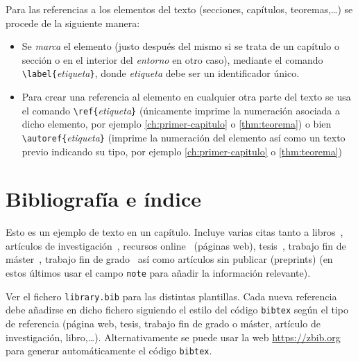 Para las referencias a los elementos del texto (secciones, capítulos, teoremas,\ldots) se procede de la siguiente manera:
\begin{itemize}
  \item Se \emph{marca} el elemento (justo después del mismo si se trata de un capítulo o sección o en el interior del \emph{entorno} en otro caso), mediante el comando \verb+\label{+\emph{etiqueta}\verb+}+, donde \emph{etiqueta} debe ser un identificador único.
  \item Para crear una referencia al elemento en cualquier otra parte del texto se usa el comando \verb+\ref{+\emph{etiqueta}\verb+}+ (únicamente imprime la numeración asociada a dicho elemento, por ejemplo \ref{ch:primer-capitulo} o \ref{thm:teorema}) o bien \verb+\autoref{+\emph{etiqueta}\verb+}+ (imprime la numeración del elemento así como un texto previo indicando su tipo, por ejemplo \autoref{ch:primer-capitulo} o \autoref{thm:teorema})
\end{itemize}




\section{Bibliografía e índice}

Esto es un ejemplo de texto en un capítulo. Incluye varias citas tanto a libros~\cite{Aigner2018}, artículos de investigación~\cite{Euler1985}, recursos online~\cite{EulerWiki} (páginas web), tesis~\cite{CitekeyPhdthesis}, trabajo fin de máster~\cite{CitekeyMastersthesis}, trabajo fin de grado~\cite{CiteKeyBachelorsthesis} así como artículos sin publicar (preprints) \cite{castroinfantes2022conjugate} (en estos últimos usar el campo \texttt{note} para añadir la información relevante). 

Ver el fichero \texttt{library.bib} para las distintas plantillas. Cada nueva referencia debe añadirse en dicho fichero siguiendo el estilo del código \texttt{bibtex} según el tipo de referencia (página web, tesis, trabajo fin de grado o máster, artículo de investigación, libro,\ldots). Alternativamente se puede usar la web \href{https://zbib.org}{https://zbib.org} para generar automáticamente el código \texttt{bibtex}.


\endinput
